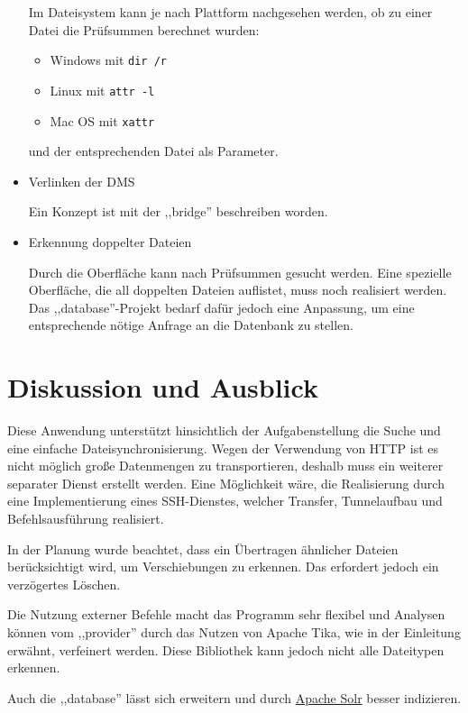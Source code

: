 \documentclass[oneside, ngerman, toc=bibliography,bibliography=totoc,listof=entryprefix, open=right,numbers=noenddot,fontsize=12pt]{scrbook}
\begin{document}
\begin{itemize}
    Im Dateisystem kann je nach Plattform nachgesehen werden, ob zu einer Datei die Prüfsummen berechnet wurden:
    \begin{itemize}
        \item Windows mit \verb|dir /r|
        \item Linux mit \verb|attr -l|
        \item Mac OS mit \verb|xattr|
    \end{itemize}
    
    und der entsprechenden Datei als Parameter.
    
	\item Verlinken der DMS 
    
    Ein Konzept ist mit der ,,bridge'' beschreiben worden.
    
	\item Erkennung doppelter Dateien
    
    Durch die Oberfläche kann nach Prüfsummen gesucht werden. Eine spezielle Oberfläche, die all doppelten Dateien auflistet, muss noch realisiert werden. Das ,,database''-Projekt bedarf dafür jedoch eine Anpassung, um eine entsprechende nötige Anfrage an die Datenbank zu stellen.
\end{itemize}



\section{Diskussion und Ausblick}
Diese Anwendung unterstützt hinsichtlich der Aufgabenstellung die Suche und eine einfache Dateisynchronisierung.
Wegen der Verwendung von HTTP ist es nicht möglich große Datenmengen zu transportieren, deshalb muss ein weiterer separater Dienst erstellt werden. Eine Möglichkeit wäre, die Realisierung durch eine Implementierung eines SSH-Dienstes, welcher Transfer, Tunnelaufbau und Befehlsausführung realisiert. 

In der Planung wurde beachtet, dass ein Übertragen ähnlicher Dateien berücksichtigt wird, um Verschiebungen zu erkennen. Das erfordert jedoch ein verzögertes Löschen.

Die Nutzung externer Befehle macht das Programm sehr flexibel und Analysen können vom ,,provider'' durch das Nutzen von Apache Tika, wie in der Einleitung erwähnt, verfeinert werden. Diese Bibliothek kann jedoch nicht alle Dateitypen erkennen.

Auch die ,,database'' lässt sich erweitern und durch \href{http://lucene.apache.org/solr/}{ Apache Solr}
besser indizieren.
\end{document}
